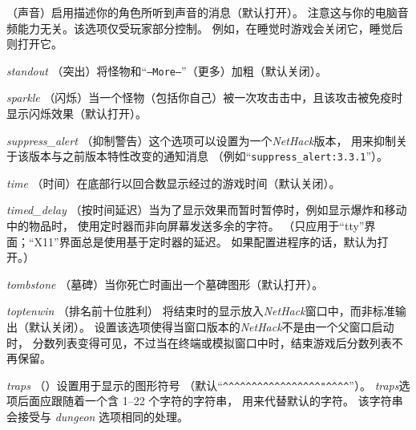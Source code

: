 \documentclass[a4paper, 10pt]{article}
\newcommand{\ib}[1]{\it #1 \hfill}
\begin{document}
（声音）启用描述你的角色所听到声音的消息（默认打开）。
注意这与你的电脑音频能力无关。该选项仅受玩家部分控制。
例如，在睡觉时游戏会关闭它，睡觉后则打开它。
\item[\ib{standout}]
（突出）将怪物和“{\tt --More--}”（更多）加粗（默认关闭）。
\item[\ib{sparkle}]
（闪烁）当一个怪物（包括你自己）被一次攻击击中，且该攻击被免疫时
显示闪烁效果（默认打开）。
\item[\ib{suppress\_alert}]
（抑制警告）这个选项可以设置为一个{\it NetHack}版本，
用来抑制关于该版本与之前版本特性改变的通知消息
（例如“{\tt suppress\_alert:3.3.1}”）。
\item[\ib{time}]
（时间）在底部行以回合数显示经过的游戏时间（默认关闭）。
\item[\ib{timed\_delay}]
（按时间延迟）当为了显示效果而暂时暂停时，例如显示爆炸和移动中的物品时，
使用定时器而非向屏幕发送多余的字符。
（只应用于“tty”界面；“X11”界面总是使用基于定时器的延迟。
如果配置进程序的话，默认为打开。）
\item[\ib{tombstone}]
（墓碑）当你死亡时画出一个墓碑图形（默认打开）。
\item[\ib{toptenwin}]
（排名前十位胜利）
将结束时的显示放入{\it NetHack}窗口中，而非标准输出（默认关闭）。
设置该选项使得当窗口版本的{\it NetHack}不是由一个父窗口启动时，
分数列表变得可见，不过当在终端或模拟窗口中时，结束游戏后分数列表不再保留。
\item[\ib{traps}]
（\zhTransTraps）设置用于显示\zhTransTraps{}的图形符号
（默认“\verb&^^^^^^^^^^^^^^^^^"^^^^&”）。
{\it traps\/}选项后面应跟随着一个含 1--22 个字符的字符串，
用来代替默认的\zhTransTraps{}字符。
该字符串会接受与 {\it dungeon\/} 选项相同的处理。
\end{document}
